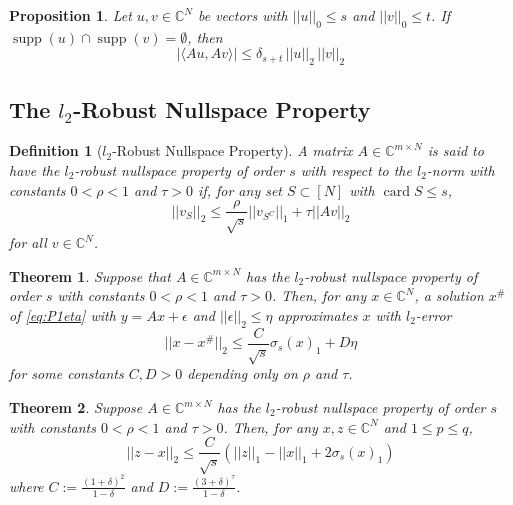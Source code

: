 \documentclass[10pt,a4paper]{article}
\theoremstyle{thmstyle}
\newtheorem{definition}{Definition}
\newtheorem{theorem}{Theorem}
\newtheorem{proposition}{Proposition}
\DeclareMathOperator{\supp}{supp}
\DeclareMathOperator{\card}{card}
\begin{document}
\begin{proposition}
  Let $u, v \in \mathbb{C}^{N}$ be vectors with $||u||_{0} \le s$ and $||v||_{0} \le t$.
  If $\supp(u) \cap \supp(v) = \emptyset$, then
  \begin{equation*}
    |\langle Au, Av \rangle| \le \delta_{s+t}\,||u||_{2}\,||v||_{2}
  \end{equation*}
\end{proposition}

\subsection{The $l_{2}$-Robust Nullspace Property}

\begin{definition}[$l_{2}$-Robust Nullspace Property]
  A matrix $A \in \mathbb{C}^{m \times N}$ is said to have the $l_{2}$-robust nullspace property of order $s$ with respect to the $l_{2}$-norm with constants $0 < \rho < 1$ and $\tau > 0$ if, for any set $S \subset [N]$ with $\card S \le s$,
  \begin{equation*}
    ||v_{S}||_{2} \le \frac{\rho}{\sqrt{s}} ||v_{S^{C}}||_{1} + \tau ||Av||_{2}
  \end{equation*}
  for all $v \in \mathbb{C}^{N}$.
\end{definition}

\begin{theorem}
  Suppose that $A \in \mathbb{C}^{m \times N}$ has the $l_{2}$-robust nullspace property of order $s$ with constants $0 < \rho < 1$ and $\tau > 0$.
  Then, for any $x \in \mathbb{C}^{N}$, a solution $x^{\#}$ of \eqref{eq:P1eta} with $y = Ax + \epsilon$ and $||\epsilon||_{2} \le \eta$ approximates $x$ with $l_{2}$-error
  \begin{equation*}
    ||x - x^{\#}||_{2} \le \frac{C}{\sqrt{s}} \sigma_{s}(x)_{1} + D\eta
  \end{equation*}
  for some constants $C, D > 0$ depending only on $\rho$ and $\tau$.
\end{theorem}

\begin{theorem}
  Suppose $A \in \mathbb{C}^{m \times N}$ has the $l_{2}$-robust nullspace property of order $s$ with constants $0 < \rho < 1$ and $\tau > 0$.
  Then, for any $x, z \in \mathbb{C}^{N}$ and $1 \le p \le q$,
  \begin{equation*}
    ||z - x||_{2} \le \frac{C}{\sqrt{s}} (||z||_{1} - ||x||_{1} + 2 \sigma_{s}(x)_{1})
  \end{equation*}
  where $C := \frac{(1 + \delta)^{2}}{1 - \delta}$ and $D := \frac{(3 + \delta)^{\tau}}{1 - \delta}$.
\end{theorem}
\end{document}
